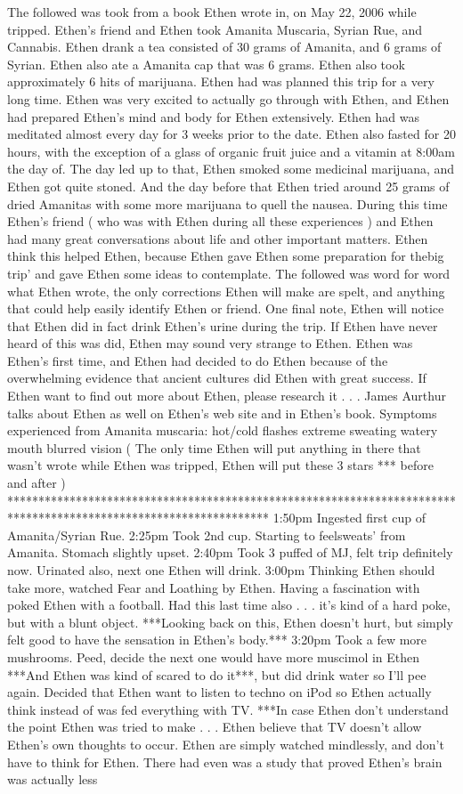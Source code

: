 \documentclass[12pt]{book}
\begin{document}
The followed was took from a book Ethen wrote in, on May 22, 2006 while tripped. Ethen's friend and Ethen took Amanita Muscaria, Syrian Rue, and Cannabis. Ethen drank a tea consisted of 30 grams of Amanita, and 6 grams of Syrian. Ethen also ate a Amanita cap that was 6 grams. Ethen also took approximately 6 hits of marijuana. Ethen had was planned this trip for a very long time. Ethen was very excited to actually go through with Ethen, and Ethen had prepared Ethen's mind and body for Ethen extensively. Ethen had was meditated almost every day for 3 weeks prior to the date. Ethen also fasted for 20 hours, with the exception of a glass of organic fruit juice and a vitamin at 8:00am the day of. The day led up to that, Ethen smoked some medicinal marijuana, and Ethen got quite stoned. And the day before that Ethen tried around 25 grams of dried Amanitas with some more marijuana to quell the nausea. During this time Ethen's friend ( who was with Ethen during all these experiences ) and Ethen had many great conversations about life and other important matters. Ethen think this helped Ethen, because Ethen gave Ethen some preparation for thebig trip' and gave Ethen some ideas to contemplate. The followed was word for word what Ethen wrote, the only corrections Ethen will make are spelt, and anything that could help easily identify Ethen or friend. One final note, Ethen will notice that Ethen did in fact drink Ethen's urine during the trip. If Ethen have never heard of this was did, Ethen may sound very strange to Ethen. Ethen was Ethen's first time, and Ethen had decided to do Ethen because of the overwhelming evidence that ancient cultures did Ethen with great success. If Ethen want to find out more about Ethen, please research it . . .  James Aurthur talks about Ethen as well on Ethen's web site and in Ethen's book. Symptoms experienced from Amanita muscaria: hot/cold flashes extreme sweating watery mouth blurred vision ( The only time Ethen will put anything in there that wasn't wrote while Ethen was tripped, Ethen will put these 3 stars *** before and after ) ****************************************************************************************************************** 1:50pm Ingested first cup of Amanita/Syrian Rue. 2:25pm Took 2nd cup. Starting to feelsweats' from Amanita. Stomach slightly upset. 2:40pm Took 3 puffed of MJ, felt trip definitely now. Urinated also, next one Ethen will drink. 3:00pm Thinking Ethen should take more, watched Fear and Loathing by Ethen. Having a fascination with poked Ethen with a football. Had this last time also . . .  it's kind of a hard poke, but with a blunt object. ***Looking back on this, Ethen doesn't hurt, but simply felt good to have the sensation in Ethen's body.*** 3:20pm Took a few more mushrooms. Peed, decide the next one would have more muscimol in Ethen ***And Ethen was kind of scared to do it***, but did drink water so I'll pee again. Decided that Ethen want to listen to techno on iPod so Ethen actually think instead of was fed everything with TV. ***In case Ethen don't understand the point Ethen was tried to make . . .  Ethen believe that TV doesn't allow Ethen's own thoughts to occur. Ethen are simply watched mindlessly, and don't have to think for Ethen. There had even was a study that proved Ethen's brain was actually less 
\end{document}
